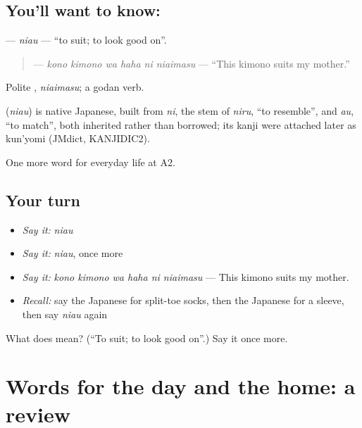 \subsection*{You'll want to know: }
\textbf{} — \emph{niau} — \textquotedblleft{}to suit; to look good on\textquotedblright{}.

\begin{quote}
\textbf{   } — \emph{kono kimono wa haha ni niaimasu} — \textquotedblleft{}This kimono suits my mother.\textquotedblright{}
\end{quote}

Polite \textbf{}, \emph{niaimasu}; a godan verb.

\begin{cousinweb}
\textbf{} (\emph{niau}) is native Japanese, built from \emph{ni}, the stem of \emph{niru}, \textquotedblleft{}to resemble\textquotedblright{}, and \emph{au}, \textquotedblleft{}to match\textquotedblright{}, both inherited rather than borrowed; its kanji were attached later as kun'yomi (JMdict, KANJIDIC2).
\end{cousinweb}

\begin{grammarlens}[title={What you've built}]
One more word for everyday life at A2.
\end{grammarlens}

\subsection*{Your turn}
\begin{itemize}
\raggedright
  \item \emph{Say it:} \emph{niau}
  \item \emph{Say it:} \emph{niau}, once more
  \item \emph{Say it:} \emph{kono kimono wa haha ni niaimasu} — This kimono suits my mother.
  \item \emph{Recall:} say the Japanese for split-toe socks, then the Japanese for a sleeve, then say \emph{niau} again
\end{itemize}

\begin{tcolorbox}[breakable,colback=teal!4,colframe=teal!35!black,title={Before you move on}]
What does  mean? (\textquotedblleft{}To suit; to look good on\textquotedblright{}.) Say it once more.
\end{tcolorbox}
\section[(dialogue)]{Words for the day and the home: a review}

